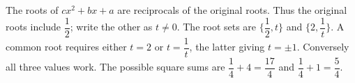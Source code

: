 The roots of $cx^2+bx+a$ are reciprocals of the original roots. Thus the original roots include $\dfrac{1}{2}$; write the other as $t\ne0$. The root sets are $\{\dfrac{1}{2},t\}$ and $\{2,\dfrac{1}{t}\}$. A common root requires either $t=2$ or $t=\dfrac{1}{t}$, the latter giving $t=\pm1$. Conversely all three values work. The possible square sums are $\dfrac{1}{4}+4=\boxed{\dfrac{17}{4}}$ and $\dfrac{1}{4}+1=\boxed{\dfrac{5}{4}}$.
